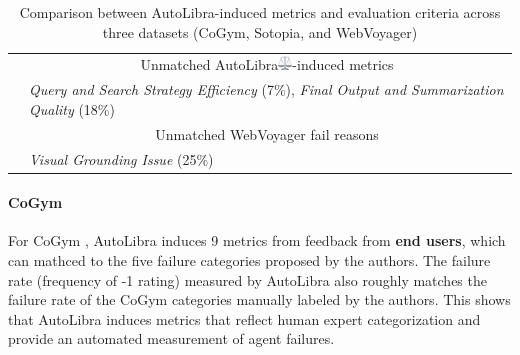 \begin{table}[!t]
\begin{tabular}{@{}lp{}p{}@{}}
        \cmidrule(lr){2-3}
        & \multicolumn{2}{c}{Unmatched AutoLibra\protect\includegraphics[height=1em]{figs/scale.png}-induced metrics} \\
        \cmidrule(lr){2-3}
        & \multicolumn{2}{C{0.93\textwidth}}{\cellcolor{unmatched}\textit{Query and Search Strategy Efficiency} (7\%), \textit{Final Output and Summarization Quality} (18\%)} \\
        \cmidrule(lr){2-3}
        & \multicolumn{2}{c}{Unmatched WebVoyager fail reasons} \\
        \cmidrule(lr){2-3}
        & \multicolumn{2}{C{0.93\textwidth}}{\cellcolor{unmatched}\textit{Visual Grounding Issue} (25\%)} \\
        \bottomrule
    \end{tabular}
    \caption{Comparison between AutoLibra-induced metrics and evaluation criteria across three datasets (CoGym, Sotopia, and WebVoyager)}
    \label{tab:merged_comparison}
\end{table}





\paragraph{CoGym}
For CoGym \citep{shao2024collaborative}, 
AutoLibra induces 9 metrics from feedback from \textbf{end users}, which can mathced to the five failure categories proposed by the authors.
The failure rate (frequency of -1 rating) measured by AutoLibra also roughly matches the failure rate of the CoGym categories manually labeled by the authors.
This shows that AutoLibra induces metrics that reflect human expert categorization and provide an automated measurement of agent failures.




